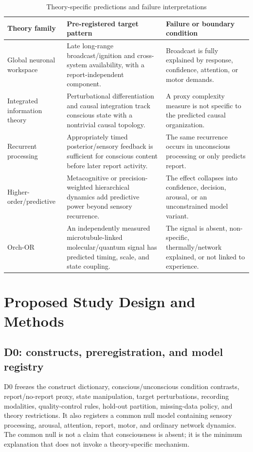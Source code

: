 \documentclass[conference]{IEEEtran}
\begin{document}
\begin{table}[t]
\caption{Theory-specific predictions and failure interpretations}
\label{tab:theory}
\centering
\footnotesize
\begin{tabular}{p{} p{} p{}}
\toprule
\textbf{Theory family} & \textbf{Pre-registered target pattern} & \textbf{Failure or boundary condition}\\
\midrule
Global neuronal workspace & Late long-range broadcast/ignition and cross-system availability, with a report-independent component. & Broadcast is fully explained by response, confidence, attention, or motor demands.\\
Integrated information theory & Perturbational differentiation and causal integration track conscious state with a nontrivial causal topology. & A proxy complexity measure is not specific to the predicted causal organization.\\
Recurrent processing & Appropriately timed posterior/sensory feedback is sufficient for conscious content before later report activity. & The same recurrence occurs in unconscious processing or only predicts report.\\
Higher-order/predictive & Metacognitive or precision-weighted hierarchical dynamics add predictive power beyond sensory recurrence. & The effect collapses into confidence, decision, arousal, or an unconstrained model variant.\\
Orch-OR & An independently measured microtubule-linked molecular/quantum signal has predicted timing, scale, and state coupling. & The signal is absent, non-specific, thermally/network explained, or not linked to experience.\\
\bottomrule
\end{tabular}
\end{table}

\section{Proposed Study Design and Methods}

\subsection{D0: constructs, preregistration, and model registry}

D0 freezes the construct dictionary, conscious/unconscious condition contrasts, report/no-report proxy, state manipulation, target perturbations, recording modalities, quality-control rules, hold-out partition, missing-data policy, and theory restrictions. It also registers a common null model containing sensory processing, arousal, attention, report, motor, and ordinary network dynamics. The common null is not a claim that consciousness is absent; it is the minimum explanation that does not invoke a theory-specific mechanism.
\end{document}
